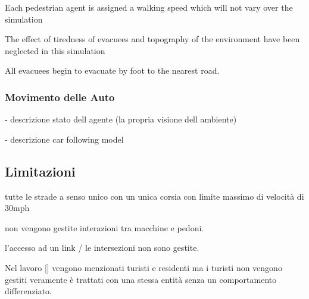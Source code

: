 Each pedestrian agent is assigned a
walking speed which will not vary over the simulation

The effect of tiredness of evacuees and topography of the
environment have been neglected in this simulation

All evacuees begin to evacuate by
foot to the nearest road.

\subsubsection{Movimento delle Auto}
- descrizione stato dell agente (la propria visione dell ambiente)

- descrizione car following model

\subsection{Limitazioni}

tutte le strade a senso unico con un unica corsia
con limite massimo di velocità di 30mph

non vengono gestite interazioni tra macchine e pedoni.

l'accesso ad un link / le intersezioni non sono gestite.

Nel lavoro [] vengono menzionati turisti e residenti
ma i turisti non vengono gestiti veramente è trattati
con una stessa entità senza un comportamento differenziato.
